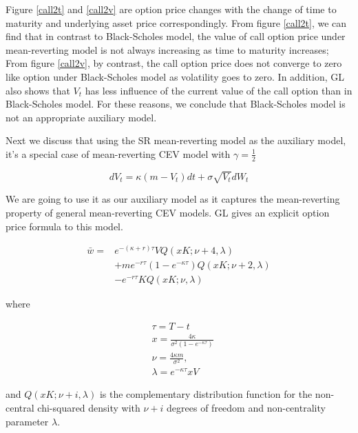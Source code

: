 Figure \ref{call2t} and \ref{call2v} are option price changes with the change of time to maturity and underlying asset price correspondingly. From figure \ref{call2t}, we can find that in contrast to Black-Scholes model, the value of call option price under mean-reverting model is not always increasing as time to maturity increases; From figure \ref{call2v}, by contrast, the call option price does not converge to zero like option under Black-Scholes model as volatility goes to zero. In addition, GL also shows that $V_t$ has less influence of the current value of the call option than in Black-Scholes model. For these reasons, we conclude that Black-Scholes model is not an appropriate auxiliary model.

Next we discuss that using the SR mean-reverting model as the auxiliary model, it's a special case of mean-reverting CEV model with $\gamma=\frac{1}{2}$

\begin{equation}
    d V_t=\kappa(m - V_t) d t+\sigma \sqrt{V_t} d W_t
\end{equation}

\noindent We are going to use it as our auxiliary model as it captures the mean-reverting property of general mean-reverting CEV models. GL gives an explicit option price formula to this model.

\begin{equation}\label{aux call price}
    \begin{aligned}
        \bar{w}=&  e^{ -(\kappa+r) \tau} V Q(x K ; \nu+4, \lambda) \\
        &+ m e^{-r \tau}(1-e^{-\kappa \tau}) Q(xK ; \nu+2, \lambda) \\
        &-e^{-r \tau} K Q(x K; \nu, \lambda)
        \end{aligned}
\end{equation}

\noindent where

$$
\begin{aligned}\label{para}
    & \tau = T-t\\
    &x=\frac{4 \kappa}{\sigma^{2}(1-e^{-\kappa \tau})} \\
    &\nu=\frac{4 \kappa m}{\sigma^{2}}, \\
    &\lambda= e^{-\kappa \tau}x V
    \end{aligned}
$$

\noindent and $Q(xK ; \nu+i, \lambda)$ is the complementary distribution function for the non-central chi-squared density with $\nu + i$ degrees of freedom and non-centrality parameter $\lambda$.

